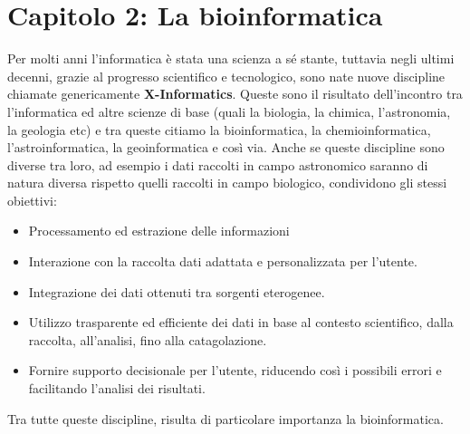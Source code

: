 \chapter{Capitolo 2: La bioinformatica}
Per molti anni l'informatica è stata una scienza a sé stante, tuttavia negli ultimi decenni, grazie al progresso scientifico e tecnologico, sono nate nuove discipline chiamate genericamente \textbf{X-Informatics}. Queste sono il risultato dell'incontro tra l'informatica ed altre scienze di base (quali la biologia, la chimica, l'astronomia, la geologia etc) e tra queste citiamo la bioinformatica, la chemioinformatica, l'astroinformatica, la geoinformatica e così via.
Anche se queste discipline sono diverse tra loro, ad esempio i dati raccolti in campo astronomico saranno di natura diversa rispetto quelli raccolti in campo biologico, condividono gli stessi obiettivi:
\begin{itemize}
	\item Processamento ed estrazione delle informazioni
	\item Interazione con la raccolta dati adattata e personalizzata per l'utente.
	\item Integrazione dei dati ottenuti tra sorgenti eterogenee.
	\item Utilizzo trasparente ed efficiente dei dati in base al contesto scientifico, dalla raccolta, all'analisi, fino alla catagolazione.
	\item Fornire supporto decisionale per l'utente, riducendo così i possibili errori e facilitando l'analisi dei risultati.
\end{itemize}
Tra tutte queste discipline, risulta di particolare importanza la bioinformatica.
